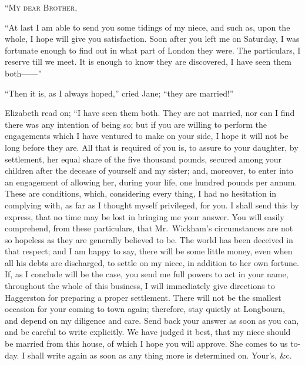 \begin{letter}

“\textsc{My dear Brother},

“At last I am able to send you some tidings of my
niece, and such as, upon the whole, I hope will give you
satisfaction. Soon after you left me on Saturday, I was
fortunate enough to find out in what part of London they
were. The particulars, I reserve till we meet. It is enough
to know they are discovered, I have seen them both------”

“Then it is, as I always hoped,” cried Jane; “they
are married!”

Elizabeth read on; “I have seen them both. They
are not married, nor can I find there was any intention
of being so; but if you are willing to perform the engagements
which I have ventured to make on your side, I hope
it will not be long before they are. All that is required
of you is, to assure to your daughter, by settlement, her
equal share of the five thousand pounds, secured among
your children after the decease of yourself and my sister;
and, moreover, to enter into an engagement of allowing
her, during your life, one hundred pounds per annum.
These are conditions, which, considering every thing, I had
no hesitation in complying with, as far as I thought
myself privileged, for you. I shall send this by express,
that no time may be lost in bringing me your answer.
You will easily comprehend, from these particulars, that
Mr.\ Wickham’s circumstances are not so hopeless as they
are generally believed to be. The world has been deceived
in that respect; and I am happy to say, there will be
some little money, even when all his debts are discharged,
to settle on my niece, in addition to her own fortune.
If, as I conclude will be the case, you send me full powers
to act in your name, throughout the whole of this business,
I will immediately give directions to Haggerston for preparing
a proper settlement. There will not be the smallest
occasion for your coming to town again; therefore, stay
quietly at Longbourn, and depend on my diligence and care.
Send back your answer as soon as you can, and be careful
to write explicitly. We have judged it best, that my niece
should be married from this house, of which I hope you
will approve. She comes to us to-day. I shall write again
as soon as any thing more is determined on. Your’s, \&c.

\end{letter}

